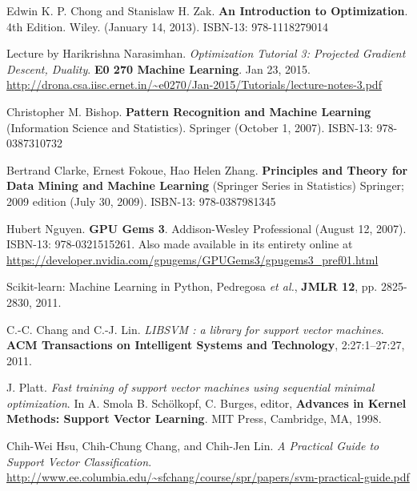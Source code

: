 \documentclass[10pt]{amsart}
\begin{document}
\begin{thebibliography}{9}
Edwin K. P. Chong and Stanislaw H. Zak.  \textbf{An Introduction to Optimization}.  4th Edition.  Wiley.  (January 14, 2013).  ISBN-13: 978-1118279014
  
Lecture by Harikrishna Narasimhan.  \emph{Optimization Tutorial 3: Projected Gradient Descent, Duality}.  \textbf{E0 270 Machine Learning}.  Jan 23, 2015.  \url{http://drona.csa.iisc.ernet.in/~e0270/Jan-2015/Tutorials/lecture-notes-3.pdf}

Christopher M. Bishop.  \textbf{Pattern Recognition and Machine Learning} (Information Science and Statistics).  Springer (October 1, 2007).  ISBN-13: 978-0387310732


Bertrand Clarke, Ernest Fokoue, Hao Helen Zhang.   \textbf{Principles and Theory for Data Mining and Machine Learning} (Springer Series in Statistics)  Springer; 2009 edition (July 30, 2009).  ISBN-13: 978-0387981345
 

Hubert Nguyen. \textbf{GPU Gems 3}.  Addison-Wesley Professional (August 12, 2007).  ISBN-13: 978-0321515261.  Also made available in its entirety online at \url{https://developer.nvidia.com/gpugems/GPUGems3/gpugems3_pref01.html}

  Scikit-learn: Machine Learning in Python, Pedregosa \emph{et al.}, \textbf{JMLR 12}, pp. 2825-2830, 2011.

  C.-C. Chang and C.-J. Lin. \emph{LIBSVM : a library for support vector machines}. \textbf{ACM Transactions on Intelligent Systems and Technology}, 2:27:1--27:27, 2011. 

  J. Platt. \emph{Fast training of support vector machines using sequential minimal optimization}. In A. Smola B. Schölkopf, C. Burges, editor, \textbf{Advances in Kernel Methods: Support Vector Learning}. MIT Press, Cambridge, MA, 1998.

Chih-Wei Hsu, Chih-Chung Chang, and Chih-Jen Lin.  \emph{A Practical Guide to Support Vector Classification}.  \url{http://www.ee.columbia.edu/~sfchang/course/spr/papers/svm-practical-guide.pdf}

  
\end{thebibliography}
\end{document}
